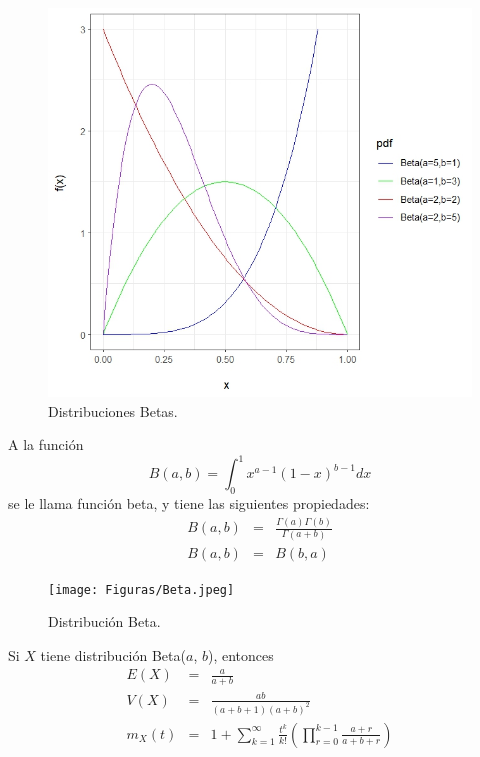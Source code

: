 \begin{i}
\begin{figure}[h!]
\centering
\includegraphics[scale=1]{Figuras/Betas.jpeg}
\caption{Distribuciones Betas.}
\end{figure}

\begin{definition}
A la función
\begin{equation*}
B(a,b)=\int_{0}^{1}x^{a-1}(1-x)^{b-1}dx
\end{equation*}
se le llama función beta, y tiene las siguientes propiedades: 
\begin{eqnarray*}
B(a,b) &=&\frac{\Gamma (a)\Gamma (b)}{\Gamma (a+b)} \\
B(a,b) &=&B(b,a)
\end{eqnarray*}
\end{definition}

\begin{figure}[h!]
\centering
\texttt{[image: Figuras/Beta.jpeg]}
\caption{Distribución Beta.}
\end{figure}


\begin{theorem}
Si $X$ tiene distribución Beta($a$, $b$), entonces
\begin{eqnarray*}
E(X) &=&\frac{a}{a+b} \\
V(X) &=&\frac{ab}{(a+b+1)(a+b)^{2}} \\
m_{X}(t) &=&1+\sum_{k=1}^{\infty }\frac{t^{k}}{k!}\left(
\prod\limits_{r=0}^{k-1}\frac{a+r}{a+b+r}\right)
\end{eqnarray*}
\end{theorem}


\end{i}
